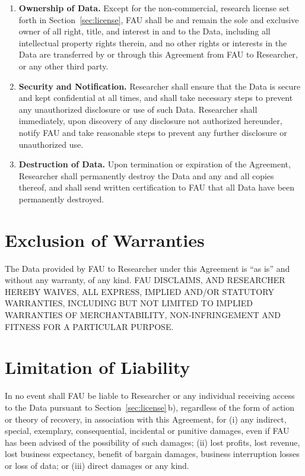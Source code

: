 \documentclass[11pt]{article}
\begin{document}
\begin{Form}
  \begin{enumerate}[label=\alph*)]
    \item \textbf{Ownership of Data.} 
     Except for the non-commercial, research license set forth in Section~\ref{sec:license}, FAU shall be and remain the sole and exclusive owner of all right, title, and interest in and to the Data, including all intellectual property rights therein, and no other rights or interests in the Data are transferred by or through this Agreement from FAU to Researcher, or any other third party.
    \item \textbf{Security and Notification.}
      Researcher shall ensure that the Data is secure and kept confidential at all times, and shall take necessary steps to prevent any unauthorized disclosure or use of such Data.
      Researcher shall immediately, upon discovery of any disclosure not authorized hereunder, notify FAU and take reasonable steps to prevent any further disclosure or unauthorized use.
    \item \textbf{Destruction of Data.}
      Upon termination or expiration of the Agreement, Researcher shall permanently destroy the Data and any and all copies thereof, and shall send written certification to FAU that all Data have been permanently destroyed.
  \end{enumerate}
  

  \section{Exclusion of Warranties}
  \label{sec:warranties}

  The Data provided by FAU to Researcher under this Agreement is ``as is'' and without any warranty, of any kind.  
  FAU DISCLAIMS, AND RESEARCHER HEREBY WAIVES, ALL EXPRESS, IMPLIED AND/OR STATUTORY WARRANTIES, INCLUDING BUT NOT LIMITED TO IMPLIED WARRANTIES OF MERCHANTABILITY, NON-INFRINGEMENT AND FITNESS FOR A PARTICULAR PURPOSE.


  \section{Limitation of Liability}
  \label{sec:liability}

  In no event shall FAU be liable to Researcher or any individual receiving access to the Data pursuant to Section~\ref{sec:license}\,b), regardless of the form of action or theory of recovery, in association with this Agreement, for 
  (i) any indirect, special, exemplary, consequential, incidental or punitive damages, even if FAU has been advised of the possibility of such damages; 
  (ii) lost profits, lost revenue, lost business expectancy, benefit of bargain damages, business interruption losses or loss of data; or 
  (iii) direct damages or any kind.



\end{Form}
\end{document}

